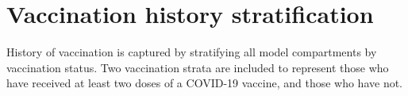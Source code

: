 \section{Vaccination history stratification}
History of vaccination is captured by stratifying all model compartments by vaccination status.
Two vaccination strata are included to represent those who have received at least two doses of a COVID-19 vaccine,
and those who have not.
